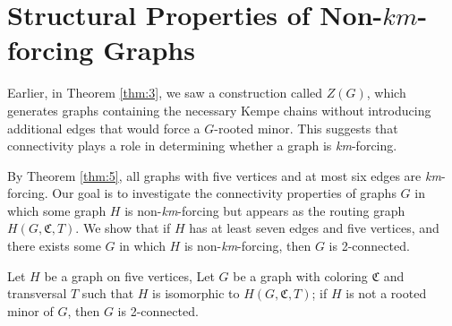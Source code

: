 \chapter{Structural Properties of Non-$km$-forcing Graphs}

Earlier, in Theorem \ref{thm:3}, we saw a construction called \( Z(G) \), which generates graphs containing the necessary Kempe chains without introducing additional
edges that would force a \( G \)-rooted minor. This suggests that connectivity plays a role in determining whether a graph is \textit{km}-forcing.

By Theorem \ref{thm:5}, all graphs with five vertices and at most six edges are \textit{km}-forcing.
Our goal is to investigate the connectivity properties of graphs \( G \) in which some graph \( H \) is non-\textit{km}-forcing but appears as the routing graph \( H(G,\mathfrak{C},T) \).
We show that if \( H \) has at least seven edges and five vertices, and there exists some \( G \) in which \( H \) is non-\textit{km}-forcing, then \( G \) is 2-connected.


\begin{lemma}
 Let $H$ be a graph on five vertices, Let $G$ be a graph with coloring $\mathfrak{C}$ and transversal $T$ such that $H$ is isomorphic to $H(G, \mathfrak{C}, T)$;
 if $H$ is not a rooted minor of $G$, then $G$ is 2-connected.
\end{lemma}

